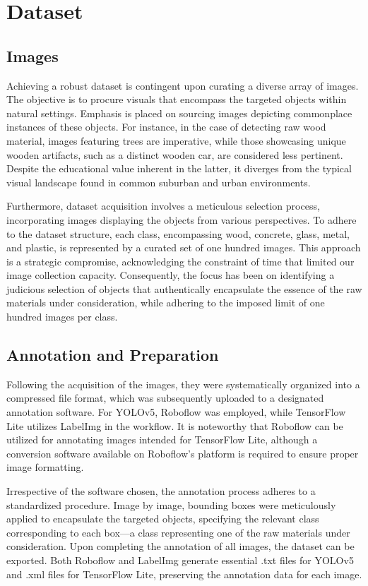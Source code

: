 \documentclass[conference]{IEEEtran}
\begin{document}
\section{Dataset}
\subsection{Images}
Achieving a robust dataset is contingent upon curating a diverse array of images. The objective is to procure visuals that encompass the targeted objects within natural settings. Emphasis is placed on sourcing images depicting commonplace instances of these objects. For instance, in the case of detecting raw wood material, images featuring trees are imperative, while those showcasing unique wooden artifacts, such as a distinct wooden car, are considered less pertinent. Despite the educational value inherent in the latter, it diverges from the typical visual landscape found in common suburban and urban environments.

Furthermore, dataset acquisition involves a meticulous selection process, incorporating images displaying the objects from various perspectives. To adhere to the dataset structure, each class, encompassing wood, concrete, glass, metal, and plastic, is represented by a curated set of one hundred images. This approach is a strategic compromise, acknowledging the constraint of time that limited our image collection capacity. Consequently, the focus has been on identifying a judicious selection of objects that authentically encapsulate the essence of the raw materials under consideration, while adhering to the imposed limit of one hundred images per class.
\subsection{Annotation and Preparation}
Following the acquisition of the images, they were systematically organized into a compressed file format, which was subsequently uploaded to a designated annotation software. For YOLOv5, Roboflow was employed, while TensorFlow Lite utilizes LabelImg in the workflow. It is noteworthy that Roboflow can be utilized for annotating images intended for TensorFlow Lite, although a conversion software available on Roboflow's platform is required to ensure proper image formatting.

Irrespective of the software chosen, the annotation process adheres to a standardized procedure. Image by image, bounding boxes were meticulously applied to encapsulate the targeted objects, specifying the relevant class corresponding to each box—a class representing one of the raw materials under consideration. Upon completing the annotation of all images, the dataset can be exported. Both Roboflow and LabelImg generate essential .txt files for YOLOv5 and .xml files for TensorFlow Lite, preserving the annotation data for each image.
\end{document}
